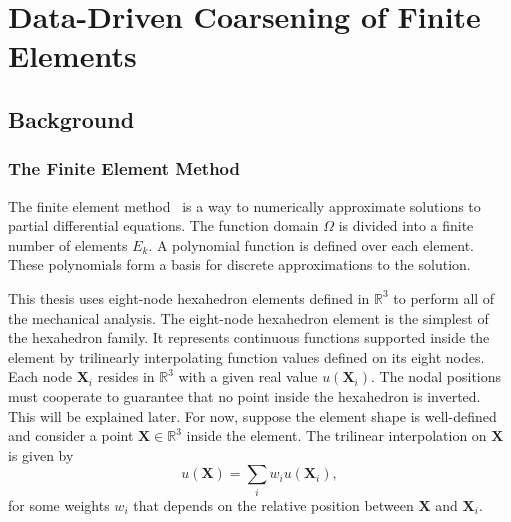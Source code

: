 \chapter{Data-Driven Coarsening of Finite Elements}
\section{Background}
\subsection{The Finite Element Method}
The finite element method~\citep{ciarlet2002finite} is a way to numerically approximate solutions to partial differential equations.
The function domain $\Omega$ is divided into a finite number of elements $E_k$.
A polynomial function is defined over each element.
These polynomials form a basis for discrete approximations to the solution.

This thesis uses eight-node hexahedron elements defined in $\mathbb{R}^3$
to perform all of the mechanical analysis.
The eight-node hexahedron element is the simplest of the hexahedron family.
It represents continuous functions supported inside the element by trilinearly interpolating function values defined on its eight nodes.
Each node $\mathbf{X}_i$ resides in $\mathbb{R}^3$ with a given real value $u(\mathbf{X}_i)$.
The nodal positions must cooperate to guarantee that no point inside the hexahedron is inverted.
This will be explained later.
For now, suppose the element shape is well-defined and 
consider a point $\mathbf{X}\in\mathbb{R}^3$ inside the element.
The trilinear interpolation on $\mathbf{X}$ is given by
\[
u(\mathbf{X})=\sum_i w_iu(\mathbf{X}_i),
\]
for some weights $w_i$ that depends on the relative position between $\mathbf{X}$ 
and $\mathbf{X}_i$.


